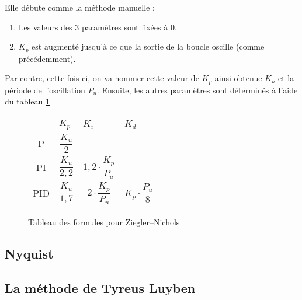 Elle débute comme la méthode manuelle :
\begin{enumerate}
	\item Les valeurs des 3 paramètres sont fixées à $0$.
	\item $K_p$ est augmenté jusqu'à ce que la sortie de la boucle oscille (comme précédemment).
\end{enumerate}

Par contre, cette fois ci, on va nommer cette valeur de $K_p$ ainsi obtenue $K_u$ et la période de l'oscillation $P_u$.
Ensuite, les autres paramètres sont déterminés à l'aide du tableau \ref{tab:ZieglerNicholsTuningFormulas}

\def\tabularxcolumn#1{m{#1}}
\begin{figure}[ht]
	\begin{center}
		\begin{tabularx}{\textwidth}{| c | X | X | X |}
			\hline
			& $K_p$ & $K_i$ & $K_d$\\ \hline
			P & \begin{equation*}\frac{K_u}{2}\end{equation*} & &\\ \hline
			PI & \begin{equation*}\frac{K_u}{2,2}\end{equation*} & \begin{equation*}1,2 \cdot \frac{K_p}{P_u}\end{equation*} &\\ \hline
			PID & \begin{equation*}\frac{K_u}{1,7}\end{equation*} & \begin{equation*}2 \cdot \frac{K_p}{P_u}\end{equation*} & \begin{equation*}K_p \cdot \frac{P_u}{8}\end{equation*} \\
			\hline
		\end{tabularx}
	\end{center}
	\caption{Tableau des formules pour Ziegler–Nichols}
	\label{tab:ZieglerNicholsTuningFormulas}
\end{figure}

\subsection{Nyquist}


\subsection{La méthode de Tyreus Luyben}

